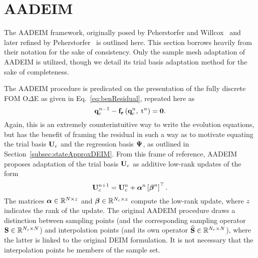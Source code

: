 \section{AADEIM}

The AADEIM framework, originally posed by Peherstorfer and Willcox~\cite{Peherstorfer2015} and later refined by Peherstorfer~\cite{Peherstorfer2020Adaptive} is outlined here. This section borrows heavily from their notation for the sake of consistency. Only the sample mesh adaptation of AADEIM is utilized, though we detail its trial basis adaptation method for the sake of completeness.

The AADEIM procedure is predicated on the presentation of the fully discrete FOM O$\Delta$E as given in Eq.~\ref{eq:benResidual}, repeated here as
%
\begin{equation}
	\mathbf{q}_{c}^{n-1} - \mathbf{f}_{\mathbf{r}}\left(\mathbf{q}_{c}^{n},\; \text{t}^{n}\right) = \mathbf{0}.
\end{equation}
%
Again, this is an extremely counterintuitive way to write the evolution equations, but has the benefit of framing the residual in such a way as to motivate equating the trial basis $\consTrial$ and the regression basis $\deimBasis$, as outlined in Section~\ref{subsec:stateApproxDEIM}. From this frame of reference, AADEIM proposes adaptation of the trial basis $\consTrial$ as additive low-rank updates of the form
%
\begin{equation}
	\consTrial^{\timeIdx+1} = \consTrial^{\timeIdx} + \adeimAlpha^{\timeIdx} \left[\adeimBeta^{\timeIdx}\right]^\top.
\end{equation}
%
The matrices $\boldsymbol{\alpha} \in \mathbb{R}^{N \times z}$ and $\boldsymbol{\beta} \in \mathbb{R}^{N_c \times z}$ compute the low-rank update, where $z$ indicates the rank of the update. The original AADEIM procedure draws a distinction between sampling points (and the corresponding sampling operator $\mathbf{S} \in \mathbb{R}^{N_s \times N}$) and interpolation points (and its own operator $\mathbf{\widehat{S}} \in \mathbb{R}^{N_r \times N}$), where the latter is linked to the original DEIM formulation. It is not necessary that the interpolation points be members of the sample set.


